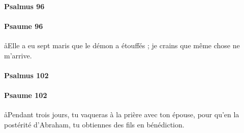 \documentclass[twoside]{article}
\begin{document}
\begin{paracol}[1]{2}

\begin{enumerate}[wide, itemsep=0mm, labelwidth=!, labelindent=0pt, label=\color{gregoriocolor}\theenumi]


\end{enumerate}

\switchcolumn*

\paragraph{Psalmus 96}


\begin{enumerate}[wide, itemsep=0mm, labelwidth=!, labelindent=0pt, label=\color{gregoriocolor}\theenumi]


\end{enumerate}

\switchcolumn

\paragraph{Psaume 96}
\aa Elle a eu sept maris que le démon a étouffés ; je crains que même chose ne m’arrive.


\begin{enumerate}[wide, itemsep=0mm, labelwidth=!, labelindent=0pt, label=\color{gregoriocolor}\theenumi]

\end{enumerate}

\switchcolumn*

\paragraph{Psalmus 102}


\begin{enumerate}[wide, itemsep=0mm, labelwidth=!, labelindent=0pt, label=\color{gregoriocolor}\theenumi]


\end{enumerate}

\switchcolumn

\paragraph{Psaume 102}
\aa Pendant trois jours, tu vaqueras à la prière avec ton épouse, pour qu’en la postérité d’Abraham, tu obtiennes des fils en bénédiction.


\end{paracol}
\end{document}
